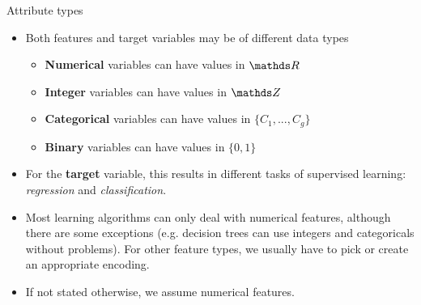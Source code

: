 
\begin{vbframe}{Attribute types}

\begin{itemize}

  \item Both features and target variables may be of different data types 
  
  \begin{itemize}
  
    \item \textbf{Numerical} variables can have values in $\R$
    
    \item \textbf{Integer} variables can have values in $\Z$
    
    \item \textbf{Categorical} variables can have values in $\{C_1,...,C_g\}$
    
    \item \textbf{Binary} variables can have values in $\{0, 1\}$
  
  \end{itemize}
  
  \item For the \textbf{target} variable, this results in different tasks of supervised learning: \textit{regression} and \textit{classification}. 
  
  \item Most learning algorithms can only deal with numerical features,
      although there are some exceptions (e.g. decision trees can use integers and categoricals without problems).
      For other feature types, we usually have to pick or create an
      appropriate encoding.
  \item If not stated otherwise, we assume numerical features.

\end{itemize}

\end{vbframe}


